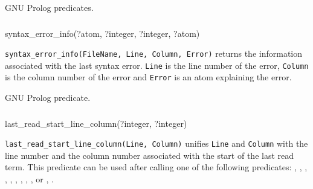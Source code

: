 \Portability

GNU Prolog predicates.

\subsubsection{\label{syntax-error-info/4}}

\begin{TemplatesOneCol}
syntax\_error\_info(?atom, ?integer, ?integer, ?atom)

\end{TemplatesOneCol}

\Description

\texttt{syntax\_error\_info(FileName, Line, Column, Error)} returns the
information associated with the last syntax error. \texttt{Line} is the line
number of the error, \texttt{Column} is the column number of the error and
\texttt{Error} is an atom explaining the error.

\begin{PlErrors}





\end{PlErrors}

\Portability

GNU Prolog predicate.

\subsubsection{}

\begin{TemplatesOneCol}
last\_read\_start\_line\_column(?integer, ?integer)

\end{TemplatesOneCol}

\Description

\texttt{last\_read\_start\_line\_column(Line, Column)} unifies \texttt{Line}
and \texttt{Column} with the line number and the column number associated with
the start of the last read term. This predicate can be used after
calling one of the following predicates: ,
, , 
, , ,
, , ,
  or ,
 .

